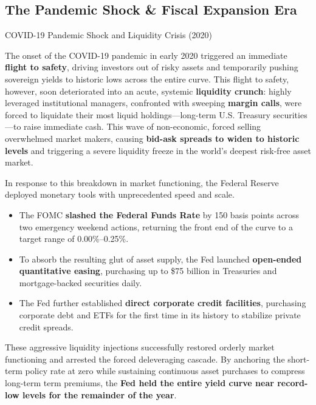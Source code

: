 \documentclass[10pt]{article}
\begin{document}
  \subsection{The Pandemic Shock \& Fiscal Expansion Era}

    \begin{core}{COVID-19 Pandemic Shock and Liquidity Crisis (2020)}

      The onset of the COVID-19 pandemic in early 2020 triggered an immediate \textbf{flight to safety}, driving investors out of risky assets and temporarily pushing sovereign yields to historic lows across the entire curve. This flight to safety, however, soon deteriorated into an acute, systemic \textbf{liquidity crunch}: highly leveraged institutional managers, confronted with sweeping \textbf{margin calls}, were forced to liquidate their most liquid holdings---long-term U.S. Treasury securities---to raise immediate cash. This wave of non-economic, forced selling overwhelmed market makers, causing \textbf{bid-ask spreads to widen to historic levels} and triggering a severe liquidity freeze in the world's deepest risk-free asset market.

      In response to this breakdown in market functioning, the Federal Reserve deployed monetary tools with unprecedented speed and scale.

      \begin{itemize}

        \item The FOMC \textbf{slashed the Federal Funds Rate} by 150 basis points across two emergency weekend actions, returning the front end of the curve to a target range of 0.00\%--0.25\%.

        \item To absorb the resulting glut of asset supply, the Fed launched \textbf{open-ended quantitative easing}, purchasing up to \$75 billion in Treasuries and mortgage-backed securities daily.

        \item The Fed further established \textbf{direct corporate credit facilities}, purchasing corporate debt and ETFs for the first time in its history to stabilize private credit spreads.

      \end{itemize}

      These aggressive liquidity injections successfully restored orderly market functioning and arrested the forced deleveraging cascade. By anchoring the short-term policy rate at zero while sustaining continuous asset purchases to compress long-term term premiums, the \textbf{Fed held the entire yield curve near record-low levels for the remainder of the year}.


    \end{core}
\end{document}
